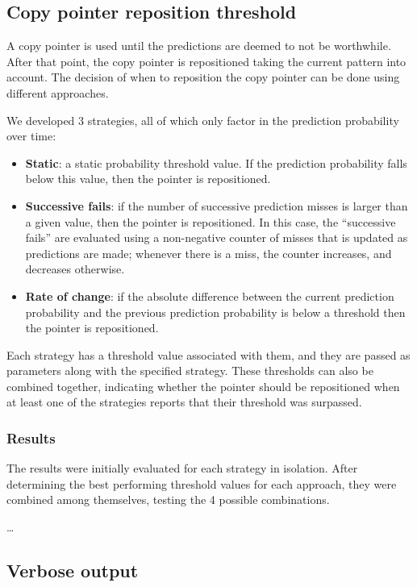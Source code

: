 \documentclass{article}
\begin{document}
\subsection{Copy pointer reposition threshold}

A copy pointer is used until the predictions are deemed to not be worthwhile.
After that point, the copy pointer is repositioned taking the current pattern into account.
The decision of when to reposition the copy pointer can be done using different approaches.

We developed 3 strategies, all of which only factor in the prediction probability over time:
\begin{itemize}
    \item \textbf{Static}: a static probability threshold value. If the prediction probability falls below this value, then the pointer is repositioned.
    \item \textbf{Successive fails}: if the number of successive prediction misses is larger than a given value, then the pointer is repositioned.
    In this case, the ``successive fails'' are evaluated using a non-negative counter of misses that is updated as predictions are made; whenever there is a miss, the counter increases, and decreases otherwise.
    \item \textbf{Rate of change}: if the absolute difference between the current prediction probability and the previous prediction probability is below a threshold then the pointer is repositioned.
\end{itemize}

Each strategy has a threshold value associated with them, and they are passed as parameters along with the specified strategy.
These thresholds can also be combined together, indicating whether the pointer should be repositioned when at least one of the strategies reports that their threshold was surpassed.

\subsubsection{Results}

The results were initially evaluated for each strategy in isolation.
After determining the best performing threshold values for each approach, they were combined among themselves, testing the 4 possible combinations.

\dots

\subsection{Verbose output}
\end{document}
